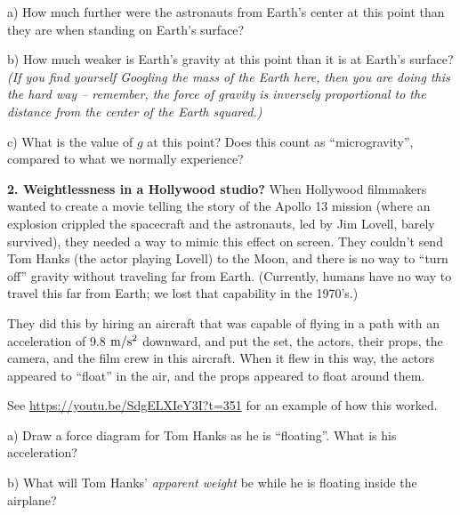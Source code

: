 \documentclass[12pt]{article}
\begin{document}
a) How much further were the astronauts from Earth's center at this point than they are when standing on Earth's surface?

\vspace{1in}

b) How much weaker is Earth's gravity at this point than it is at Earth's surface? {\it (If you find yourself Googling the mass of the Earth here, then you are doing this the hard way -- remember, the force of gravity is inversely proportional to the distance from the center of the Earth squared.)}

\vspace{1in}

c) What is the value of $g$ at this point? Does this count as ``microgravity'', compared to what we normally experience?

\newpage

{\bf 2. Weightlessness in a Hollywood studio?} When Hollywood filmmakers wanted to create a movie telling the story of the Apollo 13 mission (where an explosion crippled the spacecraft and the astronauts, led by Jim Lovell, barely survived), they needed a way to mimic this effect on screen. They couldn't send Tom Hanks (the actor playing Lovell) to the Moon, and there is no way to ``turn off'' gravity without traveling far from Earth. (Currently, humans have no way to travel this far from Earth; we lost that capability in the 1970's.)

They did this by hiring an aircraft that was capable of flying in a path with an acceleration of 9.8 $\rm m/\rm s^2$ downward, and put the set, the actors, their props, the camera, and the film  crew in this aircraft. When it flew in this way, the actors appeared to ``float'' in the air, and the props appeared to float around them.

See \url{https://youtu.be/SdgELXIeY3I?t=351} for an example of how this worked.

\bigskip

\begin{minipage}{0.475\textwidth}
a) Draw a force diagram for Tom Hanks as he is ``floating''. What is his acceleration?
\end{minipage}
\hspace{0.05\textwidth}
\begin{minipage}{0.475\textwidth}
	b) What will Tom Hanks' {\it apparent weight} be while he is floating inside the airplane?
\end{minipage}
\vspace{1.5in}
\end{document}
